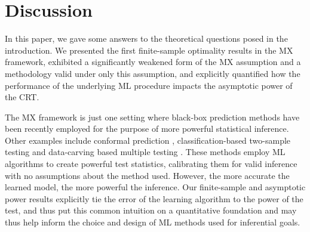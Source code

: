 \documentclass[12pt]{article}
\theoremstyle{definition}
\theoremstyle{remark}
\begin{document}
\section{Discussion}
\label{sec:discussion}

In this paper, we gave some answers to the theoretical questions posed in the introduction. We presented the first finite-sample optimality results in the MX framework, exhibited a significantly weakened form of the MX assumption and a methodology valid under only this assumption, and explicitly quantified how the performance of the underlying ML procedure impacts the asymptotic power of the CRT.


The MX framework is just one setting where black-box prediction methods have been recently employed for the purpose of more powerful statistical inference. Other examples include conformal prediction \cite{FoygelBarber2019}, classification-based two-sample testing \cite{Kim2020} and data-carving based multiple testing \cite{lei2016adapt}. These methods employ ML algorithms to create powerful test statistics, calibrating them for valid inference with no assumptions about the method used. However, the more accurate the learned model, the more powerful the inference. Our finite-sample and asymptotic power results explicitly tie the error of the learning algorithm to the power of the test, and thus put this common intuition on a quantitative foundation and may thus help inform the choice and design of ML methods used for inferential goals. 
\end{document}

